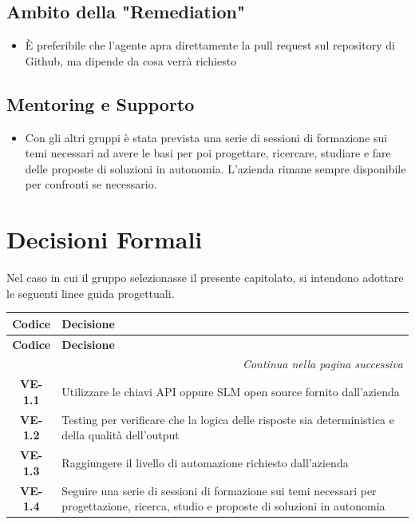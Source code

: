 \subsection{Ambito della "Remediation"}
\begin{itemize}
	\item È preferibile che l'agente apra direttamente la pull request sul repository di Github, ma dipende da cosa verrà richiesto
\end{itemize}

\subsection{Mentoring e Supporto}
\begin{itemize}
	\item Con gli altri gruppi è stata prevista una serie di sessioni di formazione sui temi necessari ad avere le basi per poi progettare, ricercare, studiare e fare delle proposte di soluzioni in autonomia. L'azienda rimane sempre disponibile per confronti se necessario.
\end{itemize}

\section{Decisioni Formali}
Nel caso in cui il gruppo selezionasse il presente capitolato, si intendono adottare le seguenti linee guida progettuali.

\renewcommand{\arraystretch}{1.3}
\vspace{-0.3cm}
\noindent
\begin{longtable}{c p{12cm}}
    \toprule
    \textbf{Codice} & \textbf{Decisione} \\
    \midrule
    \endfirsthead

    \toprule
    \textbf{Codice} & \textbf{Decisione} \\
    \midrule
    \endhead

    \midrule
    \multicolumn{2}{r}{\textit{Continua nella pagina successiva}} \\
    \midrule
    \endfoot

    \bottomrule
    \endlastfoot

    \textbf{VE-1.1} & Utilizzare le chiavi API oppure SLM open source fornito dall'azienda \\
    \textbf{VE-1.2} & Testing per verificare che la logica delle risposte sia deterministica e della qualità dell'output \\
    \textbf{VE-1.3} & Raggiungere il livello di automazione richiesto dall'azienda \\
    \textbf{VE-1.4} & Seguire una serie di sessioni di formazione sui temi necessari per progettazione, ricerca, studio e proposte di soluzioni in autonomia \\
\end{longtable}


